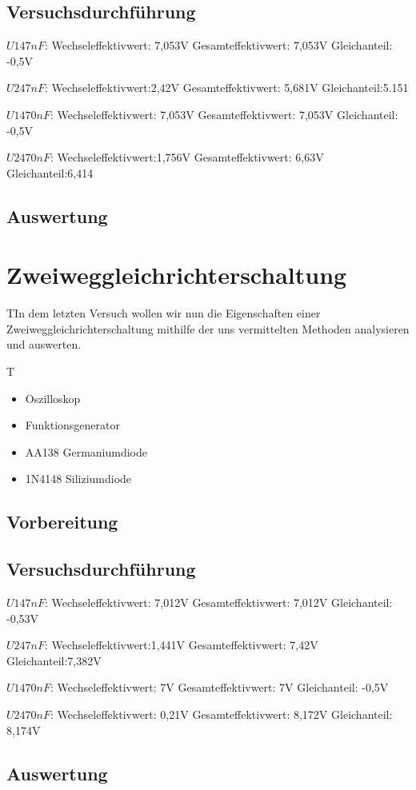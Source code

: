 \documentclass{article}
\begin{document}
\subsection{Versuchsdurchführung}
$U1 47nF$:
Wechseleffektivwert: 7,053V
Gesamteffektivwert: 7,053V
Gleichanteil: -0,5V

$U2 47nF$:
Wechseleffektivwert:2,42V
Gesamteffektivwert: 5,681V
Gleichanteil:5.151

$U1 470nF$:
Wechseleffektivwert: 7,053V
Gesamteffektivwert: 7,053V
Gleichanteil: -0,5V

$U2 470nF$:
Wechseleffektivwert:1,756V
Gesamteffektivwert: 6,63V
Gleichanteil:6,414





\subsection{Auswertung}

\section{Zweiweggleichrichterschaltung}

\begin{task}
  TIn dem letzten Versuch wollen wir nun die Eigenschaften einer Zweiweggleichrichterschaltung mithilfe der uns vermittelten
  Methoden analysieren und auswerten.
\end{task}

\begin{devlist}
  T\begin{itemize}
    \item Oszilloskop
    \item Funktionsgenerator
    \item AA138 Germaniumdiode
    \item 1N4148 Siliziumdiode
  \end{itemize}
\end{devlist}

\subsection{Vorbereitung}

\subsection{Versuchsdurchführung}


$U1 47nF$:
Wechseleffektivwert: 7,012V
Gesamteffektivwert: 7,012V
Gleichanteil: -0,53V

$U2 47nF$:
Wechseleffektivwert:1,441V
Gesamteffektivwert: 7,42V
Gleichanteil:7,382V

$U1 470nF$:
Wechseleffektivwert: 7V
Gesamteffektivwert: 7V
Gleichanteil: -0,5V

$U2 470nF$:
Wechseleffektivwert: 0,21V
Gesamteffektivwert: 8,172V
Gleichanteil: 8,174V
\subsection{Auswertung}
\end{document}
